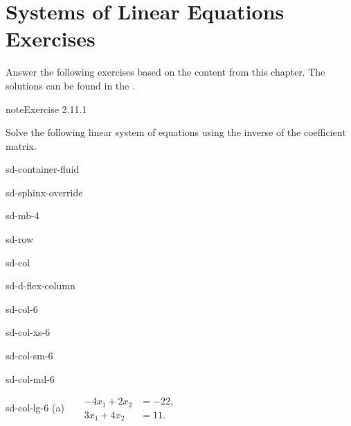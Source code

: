 \documentclass[letterpaper,10pt,english]{jupyterBook}
\begin{document}
\sphinxstepscope


\section{Systems of Linear Equations Exercises}
\label{\detokenize{_pages/2.9_Linear_systems_exercises:systems-of-linear-equations-exercises}}\label{\detokenize{_pages/2.9_Linear_systems_exercises::doc}}
\sphinxAtStartPar
Answer the following exercises based on the content from this chapter. The solutions can be found in the {\hyperref[\detokenize{_pages/A2_Linear_systems_exercises_solutions:systems-exercises-solutions}]{}}.
 \label{exercise:systems-ex-inverse-sol}

\begin{sphinxadmonition}{note}{Exercise 2.11.1}



\sphinxAtStartPar
Solve the following linear system of equations using the inverse of the coefficient matrix.

\begin{sphinxuseclass}{sd-container-fluid}
\begin{sphinxuseclass}{sd-sphinx-override}
\begin{sphinxuseclass}{sd-mb-4}
\begin{sphinxuseclass}{sd-row}
\begin{sphinxuseclass}{sd-col}
\begin{sphinxuseclass}{sd-d-flex-column}
\begin{sphinxuseclass}{sd-col-6}
\begin{sphinxuseclass}{sd-col-xs-6}
\begin{sphinxuseclass}{sd-col-sm-6}
\begin{sphinxuseclass}{sd-col-md-6}
\begin{sphinxuseclass}{sd-col-lg-6}
\sphinxAtStartPar
(a)  
\( \begin{align*}
     - 4 x_{1} + 2 x_{2} &= -22, \\
     3 x_{1} + 4 x_{2} &= 11.
\end{align*} \)


\end{sphinxuseclass}
\end{sphinxuseclass}
\end{sphinxuseclass}
\end{sphinxuseclass}
\end{sphinxuseclass}
\end{sphinxuseclass}
\end{sphinxuseclass}
\end{sphinxuseclass}
\end{sphinxuseclass}
\end{sphinxuseclass}
\end{sphinxuseclass}
\end{sphinxadmonition}
\end{document}
